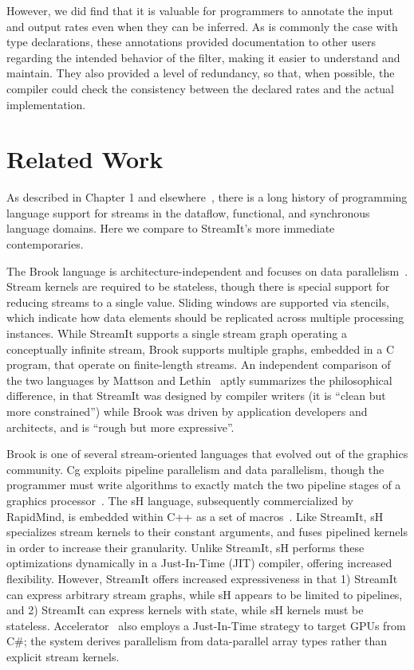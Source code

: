   However, we did find that it is valuable for programmers to annotate
  the input and output rates even when they can be inferred.  As is
  commonly the case with type declarations, these annotations provided
  documentation to other users regarding the intended behavior of the
  filter, making it easier to understand and maintain.  They also
  provided a level of redundancy, so that, when possible, the compiler
  could check the consistency between the declared rates and the
  actual implementation.

\myend

\section{Related Work}
\label{sec:lang-related}

As described in Chapter 1 and elsewhere~\cite{stephens_survey_1997},
there is a long history of programming language support for streams in
the dataflow, functional, and synchronous language domains.  Here we
compare to StreamIt's more immediate contemporaries.

The Brook language is architecture-independent and focuses on data
parallelism~\cite{brook04}.  Stream kernels are required to be
stateless, though there is special support for reducing streams to a
single value.  Sliding windows are supported via stencils, which
indicate how data elements should be replicated across multiple
processing instances.  While StreamIt supports a single stream graph
operating a conceptually infinite stream, Brook supports multiple
graphs, embedded in a C program, that operate on finite-length
streams.  An independent comparison of the two languages by Mattson
and Lethin~\cite{mattson_streaming_2003} aptly summarizes the
philosophical difference, in that StreamIt was designed by compiler
writers (it is ``clean but more constrained'') while Brook was driven
by application developers and architects, and is ``rough but more
expressive''.

Brook is one of several stream-oriented languages that evolved out of
the graphics community. Cg exploits pipeline parallelism and data
parallelism, though the programmer must write algorithms to exactly
match the two pipeline stages of a graphics processor~\cite{cg03}.
The sH language, subsequently commercialized by RapidMind, is embedded
within C++ as a set of
macros~\cite{mccool_shader_2002,mccool_shader_2004}.  Like StreamIt,
sH specializes stream kernels to their constant arguments, and fuses
pipelined kernels in order to increase their granularity.  Unlike
StreamIt, sH performs these optimizations dynamically in a
Just-In-Time (JIT) compiler, offering increased flexibility.  However,
StreamIt offers increased expressiveness in that 1) StreamIt can
express arbitrary stream graphs, while sH appears to be limited to
pipelines, and 2) StreamIt can express kernels with state, while sH
kernels must be stateless.
Accelerator~\cite{tarditi_accelerator_2006} also employs a
Just-In-Time strategy to target GPUs from C\#; the system derives
parallelism from data-parallel array types rather than explicit stream
kernels.

